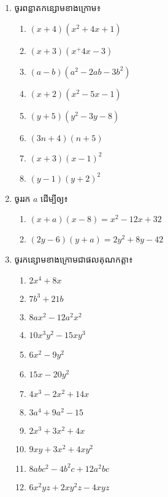 \begin{enumerate}
\item ចូរពន្លាតកន្សោមខាងក្រោម៖
\begin{multicols}{2}
\begin{enumerate}[label=\alph*.]
\item $(x+4)(x^2+4x+1)$
\item $(x+3)(x^+4x-3)$
\item $(a-b)(a^2-2ab-3b^2)$
\item $(x+2)(x^2-5x-1)$
\item $(y+5)(y^2-3y-8)$
\item $(3n+4)(n+5)$
\item $(x+3)(x-1)^2$
\item $(y-1)(y+2)^2$
\end{enumerate}
\end{multicols}
\item ចូររក $a$ ដើម្បីឲ្យ៖
\begin{multicols}{2}
\begin{enumerate}[label=\alph*.]
\item $(x+a)(x-8)=x^2-12x+32$
\item $(2y-6)(y+a)=2y^2+8y-42$
\end{enumerate}
\end{multicols}

\item ចូរកន្សោមខាងក្រោមជាផលគុណកត្តា៖
\begin{multicols}{2}
\begin{enumerate}[label=\alph*.]
\item $2x^4+8x$
\item $7b^3+21b$
\item $8ax^2-12a^2x^2$
\item $10x^3y^2-15xy^3$
\item $6x^2-9y^2$
\item $15x-20y^2$
\item $4x^3-2x^2+14x$
\item $3a^4+9a^2-15$
\item $2x^3+3x^2+4x$
\item $9xy+3x^2+4xy^2$
\item $8abc^2-4b^2c+12a^2bc$
\item $6x^2yz+2xy^2z-4xyz$
\end{enumerate}
\end{multicols}


\end{enumerate}
